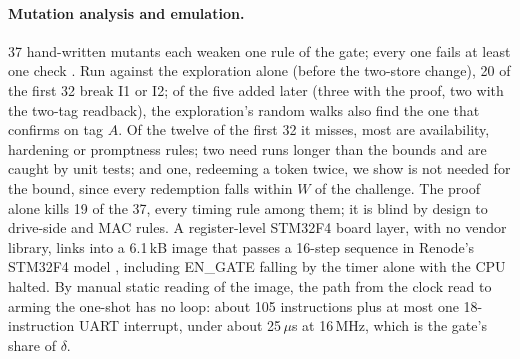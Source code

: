 \documentclass[letterpaper]{article} %
\begin{document}
\paragraph{Mutation analysis and emulation.} 37 hand-written mutants each weaken one rule of the
gate; every one fails at least one check \citep{jia2011mutation}. Run against the exploration
alone (before the two-store change), 20 of the first 32 break I1 or I2; of the five added later (three with the proof, two
with the two-tag readback), the exploration's random walks also find the one that confirms on
tag $A$. Of the twelve of the first 32 it misses, most are availability, hardening or
promptness rules; two need runs longer than the bounds and are caught by unit tests; and one,
redeeming a token twice, we show is not needed for the bound, since every redemption falls within
$W$ of the challenge. The proof alone kills 19 of the 37, every timing rule among them; it is
blind by design to drive-side and MAC rules. A register-level STM32F4 board
layer, with no vendor library, links into a 6.1\,kB image that passes a 16-step sequence in
Renode's STM32F4 model \citep{renode}, including EN\_GATE falling by the timer alone with the CPU
halted. By manual static reading of the image, the path from the clock read to arming the
one-shot has no loop: about 105
instructions plus at most one 18-instruction UART interrupt, under about 25\,$\mu$s at 16\,MHz,
which is the gate's share of $\delta$.
\end{document}
